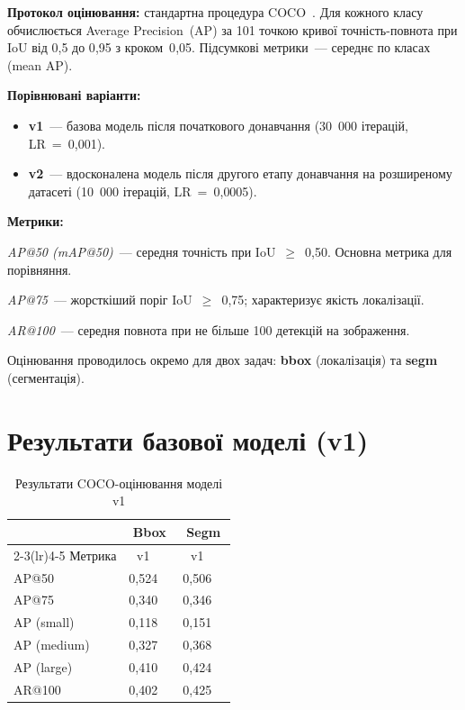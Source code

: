 \documentclass[14pt,a4paper]{extreport}
\begin{document}
\textbf{Протокол оцінювання:} стандартна процедура COCO~\cite{coco2014}.
Для кожного класу обчислюється Average Precision~(AP) за 101 точкою
кривої точність-повнота при IoU від 0{,}5 до 0{,}95 з кроком~0{,}05.
Підсумкові метрики~--- середнє по класах (mean AP).

\textbf{Порівнювані варіанти:}
\begin{itemize}
  \item \textbf{v1}~--- базова модель після початкового донавчання
        (30~000 ітерацій, LR~=~0{,}001).
  \item \textbf{v2}~--- вдосконалена модель після другого етапу
        донавчання на розширеному датасеті (10~000 ітерацій,
        LR~=~0{,}0005).
\end{itemize}

\textbf{Метрики:}

\textit{AP@50 (mAP@50)}~--- середня точність при IoU~$\geq$~0{,}50.
Основна метрика для порівняння.

\textit{AP@75}~--- жорсткіший поріг IoU~$\geq$~0{,}75; характеризує
якість локалізації.

\textit{AR@100}~--- середня повнота при не більше 100 детекцій на
зображення.

Оцінювання проводилось окремо для двох задач: \textbf{bbox}
(локалізація) та \textbf{segm} (сегментація).

\section{Результати базової моделі (v1)}

\begin{table}[H]
\caption{Результати COCO-оцінювання моделі v1}
\label{tab:coco_v1}
\centering
\begin{tabular}{@{}lcccc@{}}
\toprule
 & \multicolumn{2}{c}{Bbox} & \multicolumn{2}{c}{Segm} \\
\cmidrule(lr){2-3}\cmidrule(lr){4-5}
Метрика & v1 & & v1 & \\
\midrule
AP@50   & 0{,}524 & & 0{,}506 & \\
AP@75   & 0{,}340 & & 0{,}346 & \\
AP (small)  & 0{,}118 & & 0{,}151 & \\
AP (medium) & 0{,}327 & & 0{,}368 & \\
AP (large)  & 0{,}410 & & 0{,}424 & \\
AR@100  & 0{,}402 & & 0{,}425 & \\
\bottomrule
\end{tabular}
\end{table}
\end{document}

